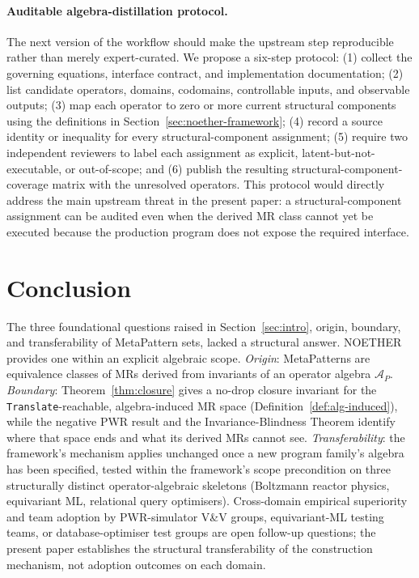 \documentclass[acmsmall,screen,review]{acmart}
\begin{document}
\paragraph{Auditable algebra-distillation protocol.}
The next version of the workflow should make the upstream step reproducible
rather than merely expert-curated. We propose a six-step protocol: (1) collect
the governing equations, interface contract, and implementation documentation;
(2) list candidate operators, domains, codomains, controllable inputs, and
observable outputs; (3) map each operator to zero or more current structural components using
the definitions in Section~\ref{sec:noether-framework}; (4) record a source
identity or inequality for every structural-component assignment; (5) require two independent
reviewers to label each assignment as explicit, latent-but-not-executable, or
out-of-scope; and (6) publish the resulting structural-component-coverage matrix with the
unresolved operators. This protocol would directly address the main upstream
threat in the present paper: a structural-component assignment can be audited even when the
derived MR class cannot yet be executed because the production program does not
expose the required interface.

\section{Conclusion}
\label{sec:conclusion}

The three foundational questions raised in Section~\ref{sec:intro}, origin,
boundary, and transferability of MetaPattern sets, lacked a structural answer.
NOETHER provides one within an explicit algebraic scope. \emph{Origin}:
MetaPatterns are equivalence classes of MRs derived from invariants of an
operator algebra $\mathcal{A}_P$. \emph{Boundary}: Theorem~\ref{thm:closure}
gives a no-drop closure invariant for the \texttt{Translate}-reachable,
algebra-induced MR space (Definition~\ref{def:alg-induced}), while the negative
PWR result and the Invariance-Blindness Theorem identify where that space ends
and what its derived MRs cannot see. \emph{Transferability}: the framework's
mechanism applies unchanged once a new program family's algebra has been
specified, tested within the framework's scope precondition on three
structurally distinct operator-algebraic skeletons (Boltzmann reactor physics,
equivariant ML, relational query optimisers). Cross-domain empirical superiority
and team adoption by PWR-simulator V\&V groups, equivariant-ML testing teams, or
database-optimiser test groups are open follow-up questions; the present paper
establishes the structural transferability of the construction mechanism, not
adoption outcomes on each domain.
\end{document}

